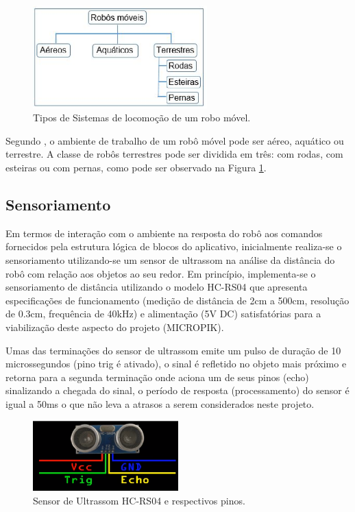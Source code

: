 \begin{figure}[H]
    \centering
    \includegraphics[width=0.6\textwidth]{figuras/locomocao.eps}
    \caption{Tipos de Sistemas de locomoção de um robo móvel.}
    \label{fig:locomocao}
\end{figure}

Segundo , o ambiente de trabalho de um robô móvel pode ser aéreo, aquático ou terrestre. A classe de robôs
terrestres pode ser dividida em três: com rodas, com esteiras ou com pernas, como pode ser observado na Figura \ref{fig:locomocao}.

\subsection{Sensoriamento}

Em termos de interação com o ambiente na resposta do robô aos comandos fornecidos pela estrutura lógica de blocos do aplicativo, inicialmente realiza-se o sensoriamento utilizando-se um sensor de ultrassom na análise da distância do robô com relação aos objetos ao seu redor. Em princípio, implementa-se o sensoriamento de distância utilizando o modelo HC-RS04 que apresenta especificações de funcionamento (medição de distância de 2cm a 500cm, resolução de 0.3cm, frequência de 40kHz) e alimentação (5V DC) satisfatórias para a viabilização deste aspecto do projeto (MICROPIK).

Umas das terminações do sensor de ultrassom emite um pulso de duração de 10 microssegundos (pino trig é ativado), o sinal é refletido no objeto mais próximo e retorna para a segunda terminação onde aciona um de seus pinos (echo) sinalizando a chegada do sinal, o período de resposta (processamento) do sensor é igual a 50ms o que não leva a atrasos a serem considerados neste projeto.

\begin{figure}[H]
    \centering
    \includegraphics[width=0.5\textwidth]{figuras/pinos_ultrassom.eps}
    \caption{Sensor de Ultrassom HC-RS04 e respectivos pinos.}
    \label{fig:pinos_ultrassom}
\end{figure}

